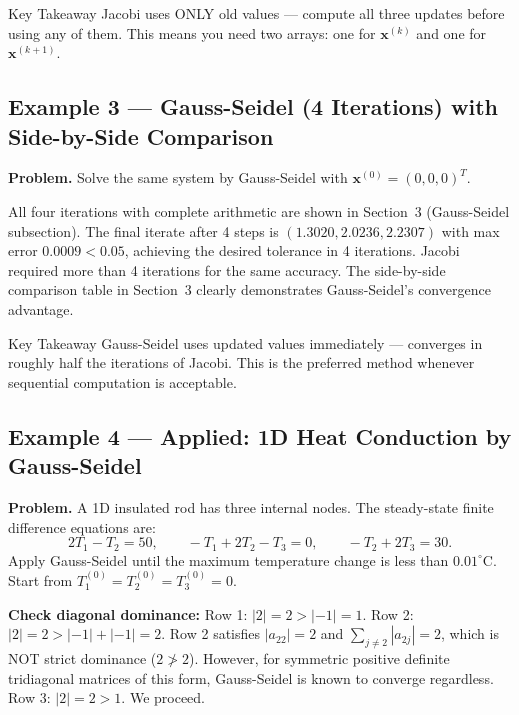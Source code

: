 \documentclass[12pt,a4paper]{article}
\begin{document}
\begin{learnbox}{Key Takeaway}
Jacobi uses ONLY old values --- compute all three updates before using any of them.
This means you need two arrays: one for \(\mathbf{x}^{(k)}\) and one for \(\mathbf{x}^{(k+1)}\).
\end{learnbox}

\subsection*{Example 3 --- Gauss-Seidel (4 Iterations) with Side-by-Side Comparison}

\textbf{Problem.} Solve the same system by Gauss-Seidel with \(\mathbf{x}^{(0)}=(0,0,0)^T\).

All four iterations with complete arithmetic are shown in Section~3 (Gauss-Seidel subsection).
The final iterate after 4 steps is \((1.3020, 2.0236, 2.2307)\) with max error \(0.0009 < 0.05\),
achieving the desired tolerance in 4 iterations. Jacobi required more than 4 iterations for
the same accuracy. The side-by-side comparison table in Section~3 clearly demonstrates
Gauss-Seidel's convergence advantage.

\begin{learnbox}{Key Takeaway}
Gauss-Seidel uses updated values immediately --- converges in roughly half the iterations
of Jacobi. This is the preferred method whenever sequential computation is acceptable.
\end{learnbox}

\subsection*{Example 4 --- Applied: 1D Heat Conduction by Gauss-Seidel}

\textbf{Problem.} A 1D insulated rod has three internal nodes. The steady-state finite
difference equations are:
\[
2T_1 - T_2 = 50, \qquad -T_1 + 2T_2 - T_3 = 0, \qquad -T_2 + 2T_3 = 30.
\]
Apply Gauss-Seidel until the maximum temperature change is less than \(0.01^{\circ}\)C.
Start from \(T_1^{(0)}=T_2^{(0)}=T_3^{(0)}=0\).

\textbf{Check diagonal dominance:}
Row 1: \(|2|=2 > |-1|=1\). Row 2: \(|2|=2 > |-1|+|-1|=2\). Row 2 satisfies
\(|a_{22}|=2\) and \(\sum_{j\neq 2}|a_{2j}|=2\), which is NOT strict dominance
(\(2 \not> 2\)). However, for symmetric positive definite tridiagonal matrices of this
form, Gauss-Seidel is known to converge regardless. Row 3: \(|2|=2 > 1\). We proceed.
\end{document}
